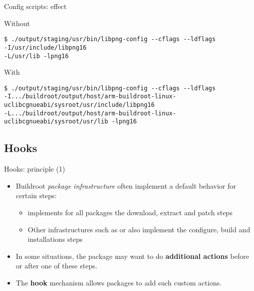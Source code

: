\begin{frame}[fragile]{Config scripts: effect}

\begin{block}{Without }
{\footnotesize
  \begin{verbatim}
$ ./output/staging/usr/bin/libpng-config --cflags --ldflags
-I/usr/include/libpng16
-L/usr/lib -lpng16
  \end{verbatim}}
\end{block}

\begin{block}{With }
{\tiny
  \begin{verbatim}
$ ./output/staging/usr/bin/libpng-config --cflags --ldflags
-I.../buildroot/output/host/arm-buildroot-linux-uclibcgnueabi/sysroot/usr/include/libpng16
-L.../buildroot/output/host/arm-buildroot-linux-uclibcgnueabi/sysroot/usr/lib -lpng16
  \end{verbatim}}
\end{block}

\end{frame}

\subsection{Hooks}

\begin{frame}{Hooks: principle (1)}
  \begin{itemize}
  \item Buildroot {\em package infrastructure} often implement a
    default behavior for certain steps:
    \begin{itemize}
    \item {} implements for all packages the
      download, extract and patch steps
    \item Other infrastructures such as  or
       also implement the configure, build and
      installations steps
    \end{itemize}
  \item In some situations, the package may want to do {\bf additional
      actions} before or after one of these steps.
  \item The {\bf hook} mechanism allows packages to add such custom
    actions.
  \end{itemize}
\end{frame}

